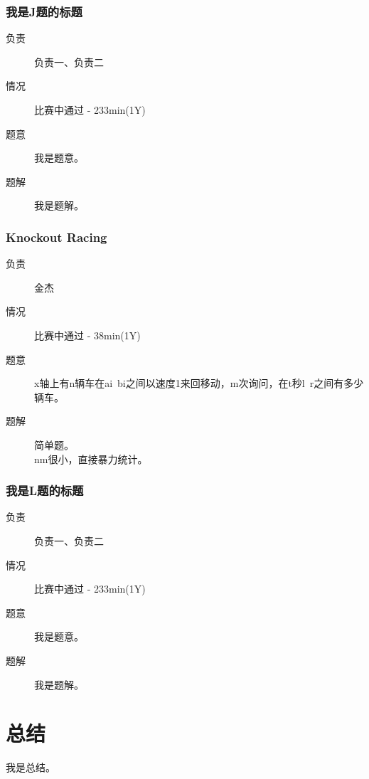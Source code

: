 \documentclass[a4paper, 11pt, nofonts, nocap, fancyhdr]{ctexart}
\newcommand{\problem}[1]{\subsubsection{#1}}
\begin{document}
\problem{我是J题的标题}

\begin{description}
\item[负责] 负责一、负责二
\item[情况] 比赛中通过 - 233min(1Y)
\item[题意]
我是题意。
\item[题解]
我是题解。
\end{description}

\problem{Knockout Racing}

\begin{description}
\item[负责] 金杰
\item[情况] 比赛中通过 - 38min(1Y)
\item[题意]
x轴上有n辆车在ai~bi之间以速度1来回移动，m次询问，在t秒l~r之间有多少辆车。
\item[题解]
简单题。\\
nm很小，直接暴力统计。
\end{description}

\problem{我是L题的标题}

\begin{description}
\item[负责] 负责一、负责二
\item[情况] 比赛中通过 - 233min(1Y)
\item[题意]
我是题意。
\item[题解]
我是题解。
\end{description}

\section{总结}

我是总结。
\end{document}
